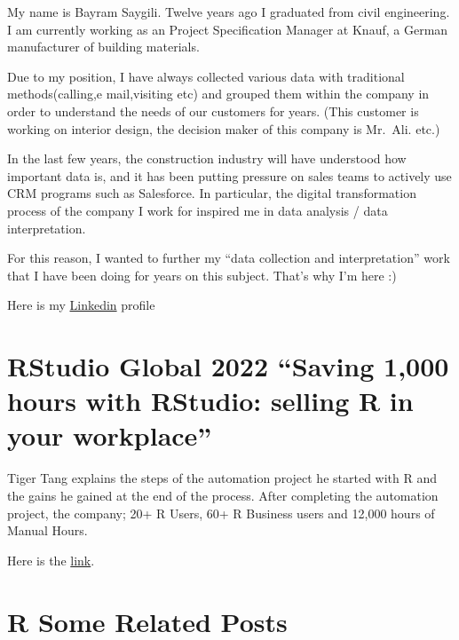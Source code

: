 \documentclass[
  letterpaper,
  DIV=11,
  numbers=noendperiod]{scrreprt}
\begin{document}
My name is Bayram Saygili. Twelve years ago I graduated from civil
engineering. I am currently working as an Project Specification Manager
at Knauf, a German manufacturer of building materials.

Due to my position, I have always collected various data with
traditional methods(calling,e mail,visiting etc) and grouped them within
the company in order to understand the needs of our customers for years.
(This customer is working on interior design, the decision maker of this
company is Mr.~Ali. etc.)

In the last few years, the construction industry will have understood
how important data is, and it has been putting pressure on sales teams
to actively use CRM programs such as Salesforce. In particular, the
digital transformation process of the company I work for inspired me in
data analysis / data interpretation.

For this reason, I wanted to further my ``data collection and
interpretation'' work that I have been doing for years on this subject.
That's why I'm here :)

Here is my
\href{https://www.linkedin.com/in/bayram-sayg\%C4\%B1l\%C4\%B1-1a525045/}{Linkedin}
profile


\hypertarget{rstudio-global-2022-saving-1000-hours-with-rstudio-selling-r-in-your-workplace}{%
\chapter{RStudio Global 2022 ``Saving 1,000 hours with RStudio: selling
R in your
workplace''}\label{rstudio-global-2022-saving-1000-hours-with-rstudio-selling-r-in-your-workplace}}

Tiger Tang explains the steps of the automation project he started with
R and the gains he gained at the end of the process. After completing
the automation project, the company; 20+ R Users, 60+ R Business users
and 12,000 hours of Manual Hours.

Here is the
\href{https://www.rstudio.com/conference/2022/talks/saving-1000-hours-rstudio/}{link}.


\hypertarget{r-some-related-posts}{%
\chapter{R Some Related Posts}\label{r-some-related-posts}}
\end{document}
